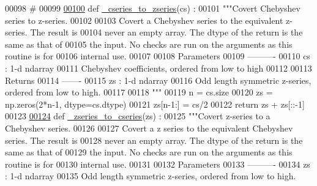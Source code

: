 \begin{DoxyCode}
00098 \textcolor{comment}{#}
00099 
\hypertarget{chebyshev_8py_source_l00100}{}\hyperlink{namespacepyneb_1_1utils_1_1chebyshev_a659e346f7cdd9fd058850b26f7e95b17}{00100} \textcolor{keyword}{def }\hyperlink{namespacepyneb_1_1utils_1_1chebyshev_a659e346f7cdd9fd058850b26f7e95b17}{\_cseries\_to\_zseries}(cs) :
00101     \textcolor{stringliteral}{"""Covert Chebyshev series to z-series.}
00102 \textcolor{stringliteral}{}
00103 \textcolor{stringliteral}{    Covert a Chebyshev series to the equivalent z-series. The result is}
00104 \textcolor{stringliteral}{    never an empty array. The dtype of the return is the same as that of}
00105 \textcolor{stringliteral}{    the input. No checks are run on the arguments as this routine is for}
00106 \textcolor{stringliteral}{    internal use.}
00107 \textcolor{stringliteral}{}
00108 \textcolor{stringliteral}{    Parameters}
00109 \textcolor{stringliteral}{    ----------}
00110 \textcolor{stringliteral}{    cs : 1-d ndarray}
00111 \textcolor{stringliteral}{        Chebyshev coefficients, ordered from low to high}
00112 \textcolor{stringliteral}{}
00113 \textcolor{stringliteral}{    Returns}
00114 \textcolor{stringliteral}{    -------}
00115 \textcolor{stringliteral}{    zs : 1-d ndarray}
00116 \textcolor{stringliteral}{        Odd length symmetric z-series, ordered from  low to high.}
00117 \textcolor{stringliteral}{}
00118 \textcolor{stringliteral}{    """}
00119     n = cs.size
00120     zs = np.zeros(2*n-1, dtype=cs.dtype)
00121     zs[n-1:] = cs/2
00122     \textcolor{keywordflow}{return} zs + zs[::-1]
00123 
\hypertarget{chebyshev_8py_source_l00124}{}\hyperlink{namespacepyneb_1_1utils_1_1chebyshev_a2a88474ce0ea12fb26f82b7116752dc1}{00124} \textcolor{keyword}{def }\hyperlink{namespacepyneb_1_1utils_1_1chebyshev_a2a88474ce0ea12fb26f82b7116752dc1}{\_zseries\_to\_cseries}(zs) :
00125     \textcolor{stringliteral}{"""Covert z-series to a Chebyshev series.}
00126 \textcolor{stringliteral}{}
00127 \textcolor{stringliteral}{    Covert a z series to the equivalent Chebyshev series. The result is}
00128 \textcolor{stringliteral}{    never an empty array. The dtype of the return is the same as that of}
00129 \textcolor{stringliteral}{    the input. No checks are run on the arguments as this routine is for}
00130 \textcolor{stringliteral}{    internal use.}
00131 \textcolor{stringliteral}{}
00132 \textcolor{stringliteral}{    Parameters}
00133 \textcolor{stringliteral}{    ----------}
00134 \textcolor{stringliteral}{    zs : 1-d ndarray}
00135 \textcolor{stringliteral}{        Odd length symmetric z-series, ordered from  low to high.}

\end{DoxyCode}
